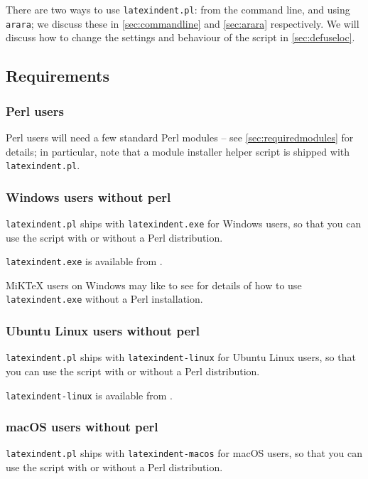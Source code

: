 \documentclass[10pt]{article}
\begin{document}
 There are two ways to use \texttt{latexindent.pl}: from the command line, and using
 \texttt{arara}; we discuss these in \cref{sec:commandline} and \cref{sec:arara}
 respectively. We will discuss how to change the settings and behaviour of the script in
 \vref{sec:defuseloc}.

\subsection{Requirements}
\subsubsection{Perl users}
 Perl users will need a few standard Perl modules -- see \vref{sec:requiredmodules} for
 details;  in particular, note
 that a module installer helper script is shipped with \texttt{latexindent.pl}.%

\subsubsection{Windows users without perl}\label{subsubsec:latexindent:exe}
 \texttt{latexindent.pl} ships with \texttt{latexindent.exe} for Windows
 users, so that you can use the script with or without a Perl distribution.

 \texttt{latexindent.exe} is available from \cite{latexindent-home}.

 MiKTeX users on Windows may like to see \cite{miktex-guide} for details of how to use
 \texttt{latexindent.exe} without a Perl installation. 
  

\subsubsection{Ubuntu Linux users without perl}
 \texttt{latexindent.pl} ships with \texttt{latexindent-linux} for Ubuntu
 Linux users, so that you can use the script with or without a Perl distribution.
   

 \texttt{latexindent-linux} is available from \cite{latexindent-home}.

\subsubsection{macOS users without perl}
 \texttt{latexindent.pl} ships with \texttt{latexindent-macos} for macOS
 users, so that you can use the script with or without a Perl distribution.
   
\end{document}
